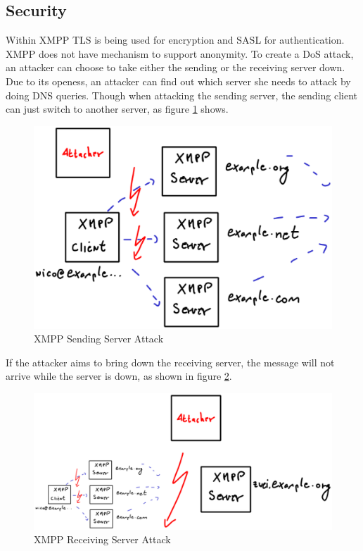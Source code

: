 \subsection{Security}
Within XMPP TLS is being used for encryption 
and SASL for authentication.
XMPP does not have mechanism to support anonymity.
To create a DoS attack, an attacker can choose to take either the sending
or the receiving server down. Due to its openess, an attacker can find out
which server she needs to attack by doing DNS queries. Though when attacking
the sending server, the sending client can just switch to another server,
as figure \ref{jabbersendingserverattack} shows.
\begin{figure}
    \centering
    \caption{XMPP Sending Server Attack}
    \label{jabbersendingserverattack}
    \includegraphics[scale=0.7]{jabbersendingserverattack.eps}
\end{figure}
If the attacker aims to bring down the receiving server, the message
will not arrive while the server is down, as shown in figure 
\ref{jabberreceivingserverattack}.
\begin{figure}
    \centering
    \caption{XMPP Receiving Server Attack}
    \label{jabberreceivingserverattack}
    \includegraphics[scale=0.7]{jabberreceivingserverattack.eps}
\end{figure}
